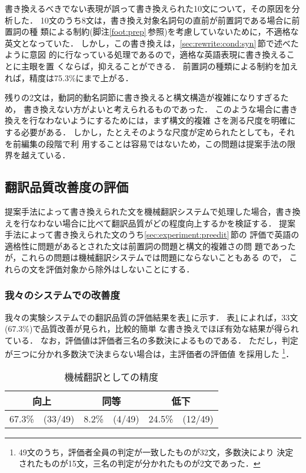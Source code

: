 書き換えるべきでない表現が誤って書き換えられた10文について，その原因を分
析した．
10文のうち8文は，書き換え対象名詞句の直前が前置詞である場合に前置詞の種
類による制約(脚注\ref{foot:prep}\,参照)を考慮していないために，不適格な
英文となっていた．
しかし，この書き換えは，\ref{sec:rewrite:cond:syn}\,節で述べたように意図
的に行なっている処理であるので，適格な英語表現に書き換えることに主眼を置
くならば，抑えることができる．
前置詞の種類による制約を加えれば，精度は75.3\%にまで上がる．

残りの2文は，動詞的動名詞節に書き換えると構文構造が複雑になりすぎるため，
書き換えない方がよいと考えられるものであった．
このような場合に書き換えを行なわないようにするためには，まず構文的複雑
さを測る尺度を明確にする必要がある．
しかし，たとえそのような尺度が定められたとしても，それを前編集の段階で利
用することは容易ではないため，この問題は提案手法の限界を越えている．

\subsection{翻訳品質改善度の評価}
\label{sec:experiment:trans}

提案手法によって書き換えられた文を機械翻訳システムで処理した場合，書き換
えを行なわない場合に比べて翻訳品質がどの程度向上するかを検証する．
提案手法によって書き換えられた文のうち\ref{sec:experiment:preedit}\,節の
評価で英語の適格性に問題があるとされた文は前置詞の問題と構文的複雑さの問
題であったが，これらの問題は機械翻訳システムでは問題にならないこともある
ので，
これらの文を評価対象から除外はしないことにする．

\subsubsection{我々のシステムでの改善度}
\label{sec:experiment:trans:ours}

我々の実験システムでの翻訳品質の評価結果を表\ref{tab:trans}\,に示す．
表\ref{tab:trans}\,によれば，33文(67.3\%)で品質改善が見られ，比較的簡単
な書き換えでほぼ有効な結果が得られている．
なお，評価値は評価者三名の多数決によるものである．
ただし，判定が三つに分かれ多数決で決まらない場合は，主評価者の評価値
を採用した
\footnote{49文のうち，評価者全員の判定が一致したものが32文，多数決により
決定されたものが15文，三名の判定が分かれたものが2文であった．}．
\begin{table}[htbp]
\caption{機械翻訳としての精度}
\label{tab:trans}
\begin{center}
\begin{tabular}{|r@{}r|r@{}r|r@{}r|} \hline
\multicolumn{2}{|c}{向上} & \multicolumn{2}{|c}{同等} & 
\multicolumn{2}{|c|}{低下} \\\hline\hline
67.3\% & (33/49) & 8.2\% & (4/49) & 24.5\% & (12/49) \\\hline
\end{tabular}
\end{center}
\end{table}

